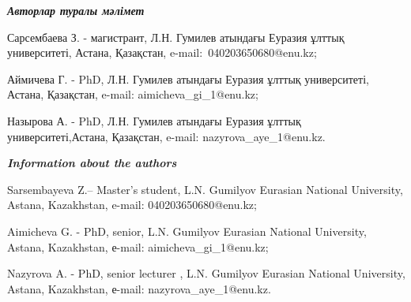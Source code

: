 \begin{info}
\hspace{1em}\emph{{\bfseries Авторлар туралы мәлімет}}

Сарсембаева З. - магистрант, Л.Н. Гумилев атындағы Еуразия ұлттық
университеті, Астана, Қазақстан,
e-mail:~040203650680@enu.kz;

Аймичева Г. - PhD, Л.Н. Гумилев атындағы Еуразия ұлттық университеті,
Астана, Қазақстан, e-mail:
aimicheva\_gi\_1@enu.kz;

Назырова А. - PhD, Л.Н. Гумилев атындағы Еуразия ұлттық
университеті,Астана, Қазақстан, e-mail: nazyrova\_aye\_1@enu.kz.

\hspace{1em}\emph{{\bfseries Information about the authors}}

Sarsembayeva Z.-- Master's student, L.N. Gumilyov Eurasian National
University, Astana, Kazakhstan, e-mail: 040203650680@enu.kz;

Aimicheva G. - PhD, senior, L.N. Gumilyov Eurasian National University,
Astana, Kazakhstan, е-mail:
aimicheva\_gi\_1@enu.kz;

Nazyrova A. - PhD, senior lecturer , L.N. Gumilyov Eurasian National
University, Astana, Kazakhstan, е-mail: nazyrova\_aye\_1@enu.kz.
\end{info}

